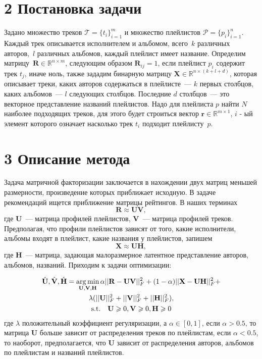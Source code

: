 \documentclass[12pt,twoside]{article}
\begin{document}
\section{2 Постановка задачи}

{Задано множество треков $\mathcal{T} = \{t_i\}_{i=1}^m$ и множество плейлистов $\mathcal{P} = \{p_i\}_{i=1}^{n}$. Каждый трек описывается исполнителем и альбомом,  всего~$k$ различных авторов,~$l$ различных альбомов, каждый плейлист имеет название. Определим матрицу~$\mathbf{R} \in \mathbb{R}^{n \times m}$, следующим образом $\mathbf{R}_{ij} = 1$, если плейлист $p_i$ содержит трек $t_j$, иначе ноль, также зададим бинарную матрицу $\mathbf{X} \in \mathbb{R}^{n \times (k + l + d)}$, которая описывает треки, каких авторов содержаться в плейлисте~--- $k$ первых столбцов, каких альбомов~--- $l$ следующих столбцов. Последние $d$ столбцов~--- это векторное представление названий плейлистов. Надо для плейлиста $p$ найти $N$ наиболее подходящих треков, для этого будет строиться вектор $\mathbf{r} \in \mathbb{R}^{m \times 1}$, $i$ - ый элемент которого означает насколько трек $t_i$ подходит плейлисту~$p$.}

\section{3 Описание метода}

{Задача матричной факторизации заключается в нахождении двух матриц меньшей размерности, произведение которых приближает исходную. В задаче рекомендаций ищется приближение матрицы рейтингов. В наших терминах  \[\mathbf{R} \approx \mathbf{UV},\] где $\mathbf{U}$~--- матрица профилей плейлистов, $\mathbf{V}$~--- матрица профилей треков. Предполагая, что профили плейлистов зависят от того, какие исполнители, альбомы входят в плейлист, какие названия у плейлистов, запишем \[\mathbf{X} \approx \mathbf{UH},\] где $\mathbf{H}$~--- матрица, задающая малоразмерное латентное представление авторов, альбомов, названий. Приходим к задачи оптимизации:

\begin{equation}
\begin{gathered}
\hat{\mathbf{U}}, \hat{\mathbf{V}}, \hat{\mathbf{H}} = \argmin_{\mathbf{U, V, H}}\alpha||\mathbf{R} - \mathbf{UV}||_F^2 +(1 - \alpha) ||\mathbf{X} - \mathbf{UH}||_F^2 + \\
 \lambda(||\mathbf{U}||_F^2 + ||\mathbf{V}||_F^2 + ||\mathbf{H}||_F^2),\\
 \text{s.t.}  \quad \mathbf{U} \geq 0,  \mathbf{V} \geq 0,   \mathbf{H} \geq 0$$
\end{gathered}
\end{equation}
где $\lambda$ положительный коэффициент регуляризации, а $\alpha \in [0, 1]$, если $\alpha > 0.5$, то матрица $\mathbf{U}$ больше зависит от распределения треков по плейлистам, если $\alpha < 0.5$, то наоборот, предполагается, что $\mathbf{U}$ зависит от распределения авторов, альбомов по плейлистам и названий плейлистов. }
\end{document}
